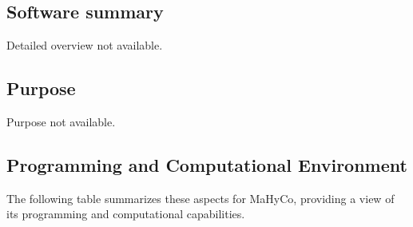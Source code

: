 \subsection{Software summary}
\label{sec:MaHyCo:summary}
Detailed overview not available.



\subsection{Purpose}
\label{sec:MaHyCo:purpose}
Purpose not available.

\subsection{Programming and Computational Environment}
\label{sec::MaHyCo:environment_capabilities}


The following table summarizes these aspects for MaHyCo, providing a  view of its programming and computational capabilities.

